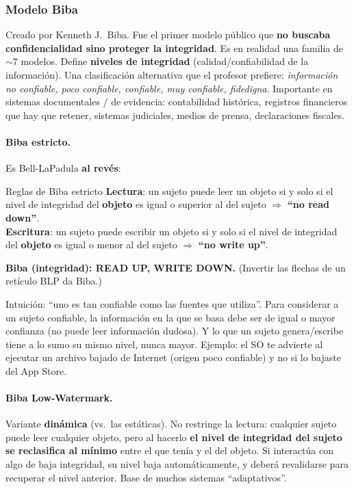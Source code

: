 \documentclass[../main.tex]{subfiles}
\begin{document}
\subsubsection{Modelo Biba}

Creado por Kenneth J.\ Biba. Fue el primer modelo público que \textbf{no buscaba confidencialidad sino proteger la integridad}. Es en realidad una familia de $\sim 7$ modelos. Define \textbf{niveles de integridad} (calidad/confiabilidad de la información). Una clasificación alternativa que el profesor prefiere: \emph{información no confiable, poco confiable, confiable, muy confiable, fidedigna}. Importante en sistemas documentales / de evidencia: contabilidad histórica, registros financieros que hay que retener, sistemas judiciales, medios de prensa, declaraciones fiscales.

\paragraph{Biba estricto.} Es Bell-LaPadula \textbf{al revés}:
\begin{definicion}{Reglas de Biba estricto}
\textbf{Lectura}: un sujeto puede leer un objeto si y solo si el nivel de integridad del \textbf{objeto} es igual o superior al del sujeto $\Rightarrow$ \textbf{``no read down''}.\\
\textbf{Escritura}: un sujeto puede escribir un objeto si y solo si el nivel de integridad del \textbf{objeto} es igual o menor al del sujeto $\Rightarrow$ \textbf{``no write up''}.
\end{definicion}

\begin{center}
\textbf{Biba (integridad): READ UP, WRITE DOWN.} (Invertir las flechas de un retículo BLP da Biba.)
\end{center}

Intuición: ``uno es tan confiable como las fuentes que utiliza''. Para considerar a un sujeto confiable, la información en la que se basa debe ser de igual o mayor confianza (no puede leer información dudosa). Y lo que un sujeto genera/escribe tiene a lo sumo su mismo nivel, nunca mayor. Ejemplo: el SO te advierte al ejecutar un archivo bajado de Internet (origen poco confiable) y no si lo bajaste del App Store.

\paragraph{Biba Low-Watermark.} Variante \textbf{dinámica} (vs.\ las estáticas). No restringe la lectura: cualquier sujeto puede leer cualquier objeto, pero al hacerlo \textbf{el nivel de integridad del sujeto se reclasifica al mínimo} entre el que tenía y el del objeto. Si interactúa con algo de baja integridad, su nivel baja automáticamente, y deberá revalidarse para recuperar el nivel anterior. Base de muchos sistemas ``adaptativos''.
\end{document}

